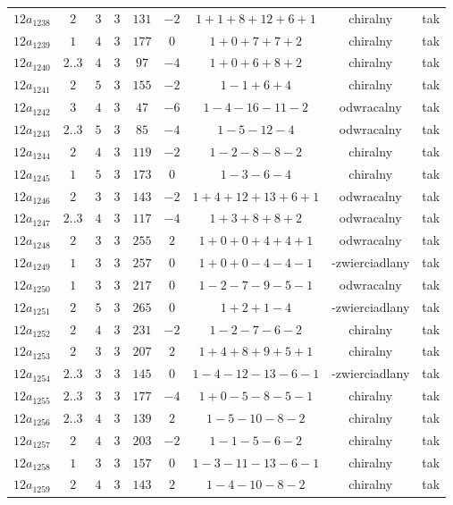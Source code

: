 \begin{longtable}{ccccccccc}
$12a_{1238}$ & $2$ & $3$ & $3$ & $131$ & $-2$ & $1+1+8+12+6+1$ & chiralny & tak \\
$12a_{1239}$ & $1$ & $4$ & $3$ & $177$ & $0$ & $1+0+7+7+2$ & chiralny & tak \\
$12a_{1240}$ & $2..3$ & $4$ & $3$ & $97$ & $-4$ & $1+0+6+8+2$ & chiralny & tak \\
$12a_{1241}$ & $2$ & $5$ & $3$ & $155$ & $-2$ & $1-1+6+4$ & chiralny & tak \\
$12a_{1242}$ & $3$ & $4$ & $3$ & $47$ & $-6$ & $1-4-16-11-2$ & odwracalny & tak \\
$12a_{1243}$ & $2..3$ & $5$ & $3$ & $85$ & $-4$ & $1-5-12-4$ & odwracalny & tak \\
$12a_{1244}$ & $2$ & $4$ & $3$ & $119$ & $-2$ & $1-2-8-8-2$ & chiralny & tak \\
$12a_{1245}$ & $1$ & $5$ & $3$ & $173$ & $0$ & $1-3-6-4$ & chiralny & tak \\
$12a_{1246}$ & $2$ & $3$ & $3$ & $143$ & $-2$ & $1+4+12+13+6+1$ & odwracalny & tak \\
$12a_{1247}$ & $2..3$ & $4$ & $3$ & $117$ & $-4$ & $1+3+8+8+2$ & odwracalny & tak \\
$12a_{1248}$ & $2$ & $3$ & $3$ & $255$ & $2$ & $1+0+0+4+4+1$ & odwracalny & tak \\
$12a_{1249}$ & $1$ & $3$ & $3$ & $257$ & $0$ & $1+0+0-4-4-1$ & -zwierciadlany & tak \\
$12a_{1250}$ & $1$ & $3$ & $3$ & $217$ & $0$ & $1-2-7-9-5-1$ & odwracalny & tak \\
$12a_{1251}$ & $2$ & $5$ & $3$ & $265$ & $0$ & $1+2+1-4$ & -zwierciadlany & tak \\
$12a_{1252}$ & $2$ & $4$ & $3$ & $231$ & $-2$ & $1-2-7-6-2$ & chiralny & tak \\
$12a_{1253}$ & $2$ & $3$ & $3$ & $207$ & $2$ & $1+4+8+9+5+1$ & chiralny & tak \\
$12a_{1254}$ & $2..3$ & $3$ & $3$ & $145$ & $0$ & $1-4-12-13-6-1$ & -zwierciadlany & tak \\
$12a_{1255}$ & $2..3$ & $3$ & $3$ & $177$ & $-4$ & $1+0-5-8-5-1$ & chiralny & tak \\
$12a_{1256}$ & $2..3$ & $4$ & $3$ & $139$ & $2$ & $1-5-10-8-2$ & chiralny & tak \\
$12a_{1257}$ & $2$ & $4$ & $3$ & $203$ & $-2$ & $1-1-5-6-2$ & chiralny & tak \\
$12a_{1258}$ & $1$ & $3$ & $3$ & $157$ & $0$ & $1-3-11-13-6-1$ & chiralny & tak \\
$12a_{1259}$ & $2$ & $4$ & $3$ & $143$ & $2$ & $1-4-10-8-2$ & chiralny & tak \\

\end{longtable}
